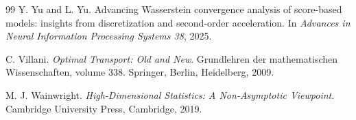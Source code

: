 \documentclass[11pt]{article}
\theoremstyle{definition}
\begin{document}
\begin{thebibliography}{99}
Y. Yu and L. Yu.
\newblock Advancing Wasserstein convergence analysis of score-based models: insights from discretization and second-order acceleration.
\newblock In \emph{Advances in Neural Information Processing Systems 38}, 2025.

C. Villani.
\newblock \emph{Optimal Transport: Old and New}.
\newblock Grundlehren der mathematischen Wissenschaften, volume 338.
Springer, Berlin, Heidelberg, 2009.

M. J. Wainwright.
\newblock \emph{High-Dimensional Statistics: A Non-Asymptotic
Viewpoint}.
\newblock Cambridge University Press, Cambridge, 2019.

\end{thebibliography}
\end{document}
